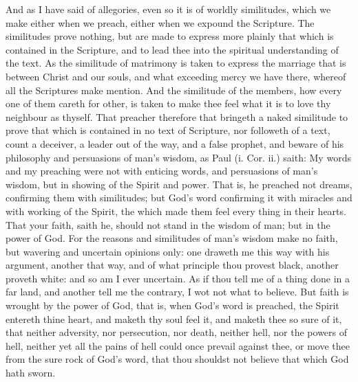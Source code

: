 And as I have said of allegories, even so it is of worldly 
similitudes, which we make either when we preach, 
either when we expound the Scripture. The similitudes 
prove nothing, but are made to express more plainly that 
which is contained in the Scripture, and to lead thee into 
the spiritual understanding of the text. As the similitude 
of matrimony is taken to express the marriage that is between
Christ and our souls, and what exceeding mercy we 
have there, whereof all the Scriptures make mention. 
And the similitude of the members, how every one of them 
careth for other, is taken to make thee feel what it is to 
love thy neighbour as thyself. That preacher therefore
that bringeth a naked similitude to prove that which is
contained in no text of Scripture, nor followeth of a text,
count a deceiver, a leader out of the way, and a false prophet,
and beware of his philosophy and persuasions of
man's wisdom, as Paul (i. Cor. ii.) saith: My words and
my preaching were not with enticing words, and persuasions
of man's wisdom, but in showing of the Spirit and
power. That is, he preached not dreams, confirming them 
with similitudes; but God's word confirming it with miracles
and with working of the Spirit, the which made 
them feel every thing in their hearts. That your faith, 
saith he, should not stand in the wisdom of man; but in 
the power of God. For the reasons and similitudes of
man's wisdom make no faith, but wavering and uncertain
opinions only: one draweth me this way with his argument,
another that way, and of what principle thou provest
black, another proveth white: and so am I ever uncertain.
As if thou tell me of a thing done in a far land, and another
tell me the contrary, I wot not what to believe. 
But faith is wrought by the power of God, that is, when
God's word is preached, the Spirit entereth thine heart,
and maketh thy soul feel it, and maketh thee so sure of it,
that neither adversity, nor persecution, nor death, neither 
hell, nor the powers of hell, neither yet all the pains of hell 
could once prevail against thee, or move thee from the 
sure rock of God's word, that thou shouldst not believe
that which God hath sworn.

